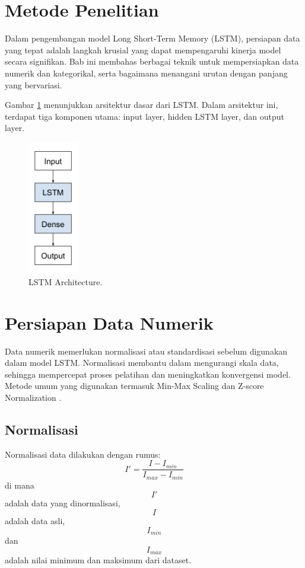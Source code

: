 \section{Metode Penelitian}
\par Dalam pengembangan model Long Short-Term Memory (LSTM), persiapan data yang tepat adalah langkah krusial yang dapat mempengaruhi kinerja model secara signifikan. Bab ini membahas berbagai teknik untuk mempersiapkan data numerik dan kategorikal, serta bagaimana menangani urutan dengan panjang yang bervariasi.
\par Gambar \ref{fig:lstm_architecture} menunjukkan arsitektur dasar dari LSTM. Dalam arsitektur ini, terdapat tiga komponen utama: input layer, hidden LSTM layer, dan output layer.

\begin{figure}[h]
    \centering
    \includegraphics[width=0.2\textwidth]{image/lstm1.png} 
    \caption{ LSTM Architecture.}
    \label{fig:lstm_architecture}
\end{figure}
\section{Persiapan Data Numerik}
\par Data numerik memerlukan normalisasi atau standardisasi sebelum digunakan dalam model LSTM. Normalisasi membantu dalam mengurangi skala data, sehingga mempercepat proses pelatihan dan meningkatkan konvergensi model. Metode umum yang digunakan termasuk Min-Max Scaling dan Z-score Normalization \citep{brownlee2017}.

\subsection{Normalisasi}
\par Normalisasi data dilakukan dengan rumus:
$$
I' = \frac{I - I_{min}}{I_{max} - I_{min}}
$$
di mana $$I'$$ adalah data yang dinormalisasi, $$I$$ adalah data asli, $$I_{min}$$ dan $$I_{max}$$ adalah nilai minimum dan maksimum dari dataset.

